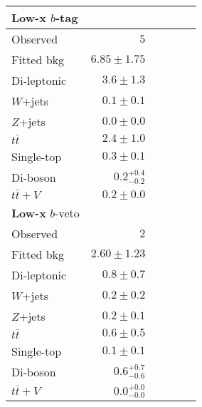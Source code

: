 \begin{tabular*}{\textwidth}{@{\extracolsep{\fill}}lrrrrr}
\toprule
\textbf{Low-x} $b$-tag &  \\
\midrule

Observed          & $5$                    \\
\midrule
Fitted bkg         & $6.85 \pm 1.75$              \\
\midrule
        Di-leptonic         & $3.6 \pm 1.3$              \\
        $W$+jets         & $0.1 \pm 0.1$              \\
        $Z$+jets         & $0.0 \pm 0.0$              \\
        $t\bar{t}$         & $2.4 \pm 1.0$              \\
        Single-top         & $0.3 \pm 0.1$              \\
        Di-boson         & $0.2_{-0.2}^{+0.4}$              \\
        $t\bar{t}+V$         & $0.2 \pm 0.0$              \\
\toprule
\textbf{Low-x} $b$-veto &  \\
\midrule
Observed          & $2$                    \\
\midrule
Fitted bkg         & $2.60 \pm 1.23$              \\
\midrule
        Di-leptonic         & $0.8 \pm 0.7$              \\
        $W$+jets         & $0.2 \pm 0.2$              \\
        $Z$+jets         & $0.2 \pm 0.1$              \\
        $t\bar{t}$         & $0.6 \pm 0.5$              \\
        Single-top         & $0.1 \pm 0.1$              \\
        Di-boson         & $0.6_{-0.6}^{+0.7}$              \\
        $t\bar{t}+V$         & $0.0_{-0.0}^{+0.0}$              \\


\bottomrule
\end{tabular*}




